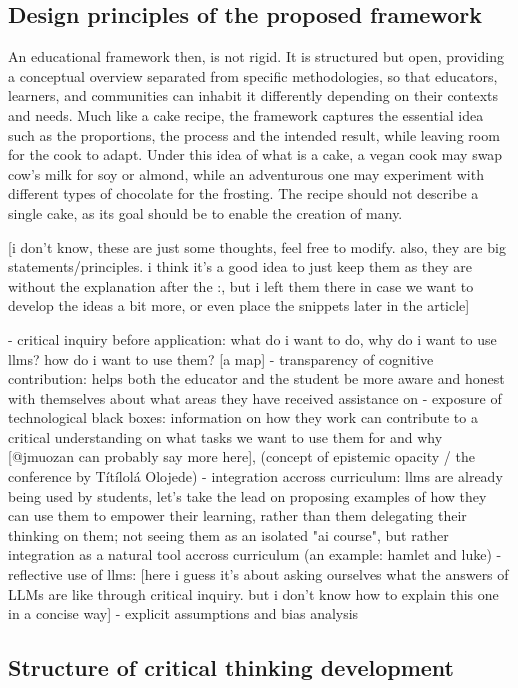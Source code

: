 \documentclass{article}
\begin{document}
\subsection{Design principles of the proposed framework}

An educational framework then, is not rigid. It is structured but open, providing a conceptual overview separated from specific methodologies, so that educators, learners, and communities can inhabit it differently depending on their contexts and needs. Much like a cake recipe, the framework captures the essential idea such as the proportions, the process and the intended result, while leaving room for the cook to adapt. Under this idea of what is a cake, a vegan cook may swap cow's milk for soy or almond, while an adventurous one may experiment with different types of chocolate for the frosting. The recipe should not describe a single cake, as its goal should be to enable the creation of many.


[i don't know, these are just some thoughts, feel free to modify. also, they are big statements/principles. i think it's a good idea to just keep them as they are without the explanation after the :, but i left them there in case we want to develop the ideas a bit more, or even place the snippets later in the article]

- critical inquiry before application: what do i want to do, why do i want to use llms? how do i want to use them? [a map]
- transparency of cognitive contribution: helps both the educator and the student be more aware and honest with themselves about what areas they have received assistance on
- exposure of technological black boxes: information on how they work can contribute to a critical understanding on what tasks we want to use them for and why [@jmuozan can probably say more here], (concept of epistemic opacity / the conference by Títílolá Olojede)
- integration accross curriculum: llms are already being used by students, let's take the lead on proposing examples of how they can use them to empower their learning, rather than them delegating their thinking on them; not seeing them as an isolated "ai course", but rather integration as a natural tool accross curriculum (an example: hamlet and luke)
- reflective use of llms:  [here i guess it's about asking ourselves what the answers of LLMs are like through critical inquiry. but i don't know how to explain this one in a concise way]
- explicit assumptions and bias analysis

\subsection{Structure of critical thinking development}
\end{document}
